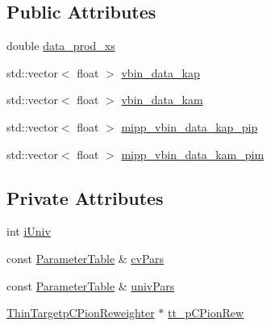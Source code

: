 \subsection*{Public Attributes}
\begin{DoxyCompactItemize}
\item 
double \hyperlink{class_neutrino_flux_reweight_1_1_thin_targetp_c_kaon_reweighter_ae26e9fbd1c42a53759a1587a3312a4fb}{data\-\_\-prod\-\_\-xs}
\item 
std\-::vector$<$ float $>$ \hyperlink{class_neutrino_flux_reweight_1_1_thin_targetp_c_kaon_reweighter_a7e9b49e61de648fbe1198c3ae68ce15f}{vbin\-\_\-data\-\_\-kap}
\item 
std\-::vector$<$ float $>$ \hyperlink{class_neutrino_flux_reweight_1_1_thin_targetp_c_kaon_reweighter_afdc746047f72743b45affc7f51f8ba3f}{vbin\-\_\-data\-\_\-kam}
\item 
std\-::vector$<$ float $>$ \hyperlink{class_neutrino_flux_reweight_1_1_thin_targetp_c_kaon_reweighter_a6ad9b6cccb6fc522708b1aa5b9070c71}{mipp\-\_\-vbin\-\_\-data\-\_\-kap\-\_\-pip}
\item 
std\-::vector$<$ float $>$ \hyperlink{class_neutrino_flux_reweight_1_1_thin_targetp_c_kaon_reweighter_ab268b6554b6abe96854cec82f336816d}{mipp\-\_\-vbin\-\_\-data\-\_\-kam\-\_\-pim}
\end{DoxyCompactItemize}
\subsection*{Private Attributes}
\begin{DoxyCompactItemize}
\item 
int \hyperlink{class_neutrino_flux_reweight_1_1_thin_targetp_c_kaon_reweighter_a3ff9d5c19007a8272c69e15cc3c7742b}{i\-Univ}
\item 
const \hyperlink{class_neutrino_flux_reweight_1_1_parameter_table}{Parameter\-Table} \& \hyperlink{class_neutrino_flux_reweight_1_1_thin_targetp_c_kaon_reweighter_a474281c2bfbea82f8ddfad0cab1f1146}{cv\-Pars}
\item 
const \hyperlink{class_neutrino_flux_reweight_1_1_parameter_table}{Parameter\-Table} \& \hyperlink{class_neutrino_flux_reweight_1_1_thin_targetp_c_kaon_reweighter_a09bb649b2bc0b55691bcd9bc1228536b}{univ\-Pars}
\item 
\hyperlink{class_neutrino_flux_reweight_1_1_thin_targetp_c_pion_reweighter}{Thin\-Targetp\-C\-Pion\-Reweighter} $\ast$ \hyperlink{class_neutrino_flux_reweight_1_1_thin_targetp_c_kaon_reweighter_ab6dbf86a7f242f29d1f4e67bf1dc7e2f}{tt\-\_\-p\-C\-Pion\-Rew}
\end{DoxyCompactItemize}


